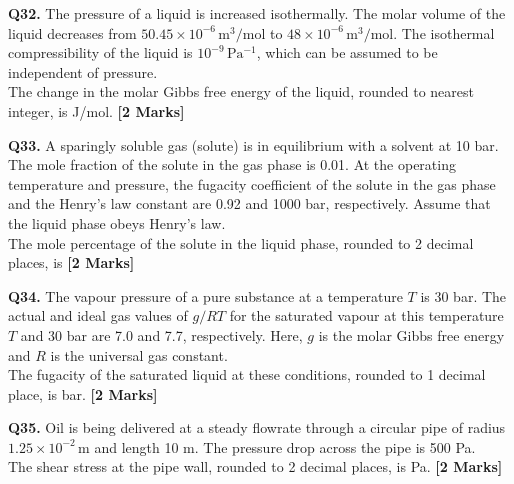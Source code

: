 \documentclass[11pt]{article}
\newcommand{\questionb}[2]{
    \noindent\textbf{Q#2.} #1 \hfill \textbf{[2 Marks]}
}
\begin{document}
\questionb{The pressure of a liquid is increased isothermally. The molar volume of the liquid decreases from \( 50.45 \times 10^{-6} \,\mathrm{m^3/mol} \) to \( 48 \times 10^{-6} \,\mathrm{m^3/mol} \). The isothermal compressibility of the liquid is \( 10^{-9} \,\mathrm{Pa^{-1}} \), which can be assumed to be independent of pressure. \\  
The change in the molar Gibbs free energy of the liquid, rounded to nearest integer, is J/mol.}{32}
\vspace{0.5cm}

\questionb{A sparingly soluble gas (solute) is in equilibrium with a solvent at 10 bar. The mole fraction of the solute in the gas phase is 0.01. At the operating temperature and pressure, the fugacity coefficient of the solute in the gas phase and the Henry's law constant are 0.92 and 1000 bar, respectively. Assume that the liquid phase obeys Henry’s law. \\  
The mole percentage of the solute in the liquid phase, rounded to 2 decimal places, is}{33}
\vspace{0.5cm}

\questionb{The vapour pressure of a pure substance at a temperature \( T \) is 30 bar. The actual and ideal gas values of \( g/RT \) for the saturated vapour at this temperature \( T \) and 30 bar are 7.0 and 7.7, respectively. Here, \( g \) is the molar Gibbs free energy and \( R \) is the universal gas constant. \\  
The fugacity of the saturated liquid at these conditions, rounded to 1 decimal place, is bar.}{34}
\vspace{0.5cm}

\questionb{Oil is being delivered at a steady flowrate through a circular pipe of radius \( 1.25 \times 10^{-2} \,\mathrm{m} \) and length 10 m. The pressure drop across the pipe is 500 Pa. \\  
The shear stress at the pipe wall, rounded to 2 decimal places, is Pa.}{35}
\vspace{0.5cm}
\end{document}
